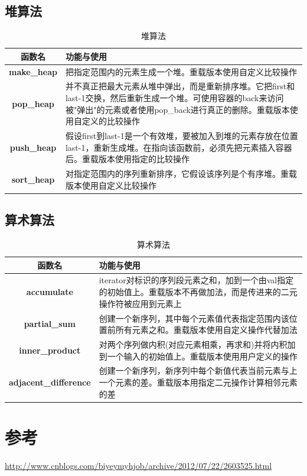 \documentclass[UTF8,a4paper,12pt]{ctexbook}
\begin{document}
	\section{堆算法}
	\begin{table}[H]
		\centering
		\caption{堆算法}
		\begin{tabular}{c|m{15cm}}
			\hline 
			函数名 & 功能与使用\\
			\hline
			\textbf{make\_heap}	& 把指定范围内的元素生成一个堆。重载版本使用自定义比较操作\\
			\hline 
			\textbf{pop\_heap}  & 并不真正把最大元素从堆中弹出，而是重新排序堆。它把first和last-1交换，然后重新生成一个堆。可使用容器的back来访问被"弹出"的元素或者使用pop\_back进行真正的删除。重载版本使用自定义的比较操作\\
			\hline 
			\textbf{push\_heap}  & 假设first到last-1是一个有效堆，要被加入到堆的元素存放在位置last-1，重新生成堆。在指向该函数前，必须先把元素插入容器后。重载版本使用指定的比较操作\\
			\hline 
			\textbf{sort\_heap} & 对指定范围内的序列重新排序，它假设该序列是个有序堆。重载版本使用自定义比较操作\\
			\hline 
		\end{tabular}
	\end{table}
	
	\section{算术算法}
	\begin{table}[H]
		\centering
		\caption{算术算法}
		\begin{tabular}{c|m{13cm}}
			\hline 
			函数名 & 功能与使用\\
			\hline
			\textbf{accumulate}	& iterator对标识的序列段元素之和，加到一个由val指定的初始值上。重载版本不再做加法，而是传进来的二元操作符被应用到元素上\\
			\hline 
			\textbf{partial\_sum}  & 创建一个新序列，其中每个元素值代表指定范围内该位置前所有元素之和。重载版本使用自定义操作代替加法\\
			\hline 
			\textbf{inner\_product}  & 对两个序列做内积(对应元素相乘，再求和)并将内积加到一个输入的初始值上。重载版本使用用户定义的操作\\
			\hline 
			\textbf{adjacent\_difference} & 创建一个新序列，新序列中每个新值代表当前元素与上一个元素的差。重载版本用指定二元操作计算相邻元素的差\\
			\hline 
		\end{tabular}
	\end{table}
\chapter{参考}
	\url{http://www.cnblogs.com/biyeymyhjob/archive/2012/07/22/2603525.html} 
\end{document}

